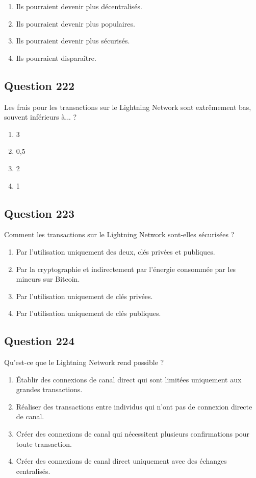 \documentclass[12pt,a4paper]{article}
\begin{document}
\begin{enumerate}[label=\Alph*., leftmargin=*]
\item Ils pourraient devenir plus décentralisés.
\item Ils pourraient devenir plus populaires.
\item Ils pourraient devenir plus sécurisés.
\item Ils pourraient disparaître.
\end{enumerate}

\bigskip


\subsection*{Question 222}
Les frais pour les transactions sur le Lightning Network sont extrêmement bas, souvent inférieurs à... ?

\begin{enumerate}[label=\Alph*., leftmargin=*]
\item 3 %
\item 0,5 %
\item 2 %
\item 1 %
\end{enumerate}

\bigskip


\subsection*{Question 223}
Comment les transactions sur le Lightning Network sont-elles sécurisées ?

\begin{enumerate}[label=\Alph*., leftmargin=*]
\item Par l'utilisation uniquement des deux, clés privées et publiques.
\item Par la cryptographie et indirectement par l'énergie consommée par les mineurs sur Bitcoin.
\item Par l'utilisation uniquement de clés privées.
\item Par l'utilisation uniquement de clés publiques.
\end{enumerate}

\bigskip


\subsection*{Question 224}
Qu'est-ce que le Lightning Network rend possible ?

\begin{enumerate}[label=\Alph*., leftmargin=*]
\item Établir des connexions de canal direct qui sont limitées uniquement aux grandes transactions.
\item Réaliser des transactions entre individus qui n'ont pas de connexion directe de canal.
\item Créer des connexions de canal qui nécessitent plusieurs confirmations pour toute transaction.
\item Créer des connexions de canal direct uniquement avec des échanges centralisés.
\end{enumerate}
\end{document}
